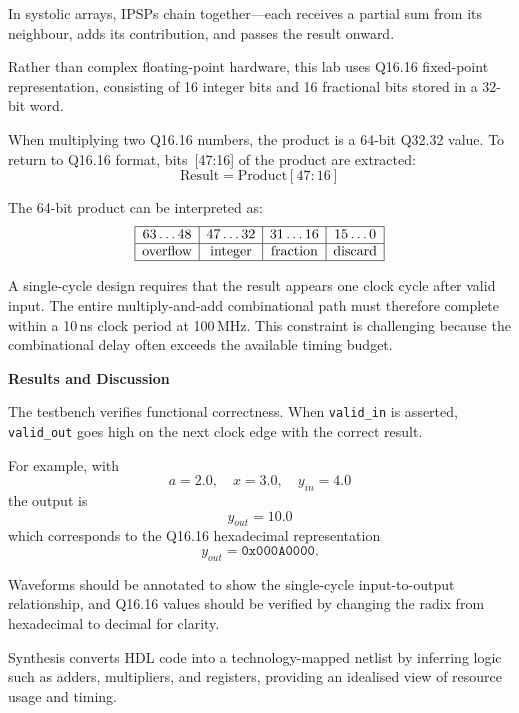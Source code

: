\documentclass[a4paper,12pt]{article}
\begin{document}
In systolic arrays, IPSPs chain together—each receives a partial sum from its neighbour, adds its contribution, and passes the result onward.

Rather than complex floating-point hardware, this lab uses Q16.16 fixed-point representation, consisting of 16 integer bits and 16 fractional bits stored in a 32-bit word.

When multiplying two Q16.16 numbers, the product is a 64-bit Q32.32 value. To return to Q16.16 format, bits~[47:16] of the product are extracted:
\begin{equation}
\text{Result} = \text{Product}[47:16]
\end{equation}

The 64-bit product can be interpreted as:
\[
\begin{array}{|c|c|c|c|}
\hline
63\ldots48 & 47\ldots32 & 31\ldots16 & 15\ldots0 \\
\hline
\text{overflow} & \text{integer} & \text{fraction} & \text{discard} \\
\hline
\end{array}
\]

A single-cycle design requires that the result appears one clock cycle after valid input. The entire multiply-and-add combinational path must therefore complete within a 10\,ns clock period at 100\,MHz. This constraint is challenging because the combinational delay often exceeds the available timing budget.

\textbf{Results and Discussion}

The testbench verifies functional correctness. When \texttt{valid\_in} is asserted, \texttt{valid\_out} goes high on the next clock edge with the correct result.

For example, with
\begin{equation}
a = 2.0, \quad x = 3.0, \quad y_{in} = 4.0
\end{equation}
the output is
\begin{equation}
y_{out} = 10.0
\end{equation}
which corresponds to the Q16.16 hexadecimal representation
\begin{equation}
y_{out} = \texttt{0x000A0000}.
\end{equation}

Waveforms should be annotated to show the single-cycle input-to-output relationship, and Q16.16 values should be verified by changing the radix from hexadecimal to decimal for clarity.

Synthesis converts HDL code into a technology-mapped netlist by inferring logic such as adders, multipliers, and registers, providing an idealised view of resource usage and timing. 
\end{document}
